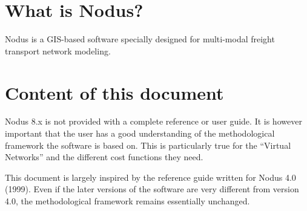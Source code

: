 
\section{What is Nodus?}

Nodus is a GIS-based  software specially designed for  multi-modal freight
transport network modeling.


\section{Content of this document}

Nodus 8.x is not provided with a complete reference or user guide. It is
however important that the user has a good understanding of the methodological
framework the software is based on. This is particularly true for the ``Virtual
Networks'' and the different cost functions they need.

This document is largely inspired by the reference guide  written for Nodus 4.0
(1999). Even if the later versions of the software are very different from
version 4.0, the methodological framework remains essentially unchanged.

